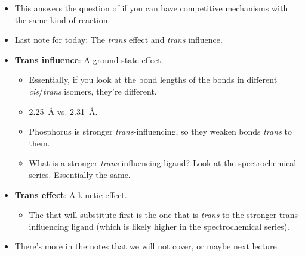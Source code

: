 \documentclass[../notes.tex]{subfiles}
\begin{document}
\begin{itemize}
    \item This answers the question of if you can have competitive mechanisms with the same kind of reaction.
    \item Last note for today: The \emph{trans} effect and \emph{trans} influence.
    \item \textbf{Trans influence}: A ground state effect.
    \begin{itemize}
        \item Essentially, if you look at the bond lengths of the  bonds in different \emph{cis}/\emph{trans} isomers, they're different.
        \item \SI{2.25}{\angstrom} vs. \SI{2.31}{\angstrom}.
        \item Phosphorus is stronger \emph{trans}-influencing, so they weaken bonds \emph{trans} to them.
        \item What is a stronger \emph{trans} influencing ligand? Look at the spectrochemical series. Essentially the same.
    \end{itemize}
    \item \textbf{Trans effect}: A kinetic effect.
    \begin{itemize}
        \item The  that will substitute first is the one that is \emph{trans} to the stronger trans-influencing ligand (which is likely higher in the spectrochemical series).
    \end{itemize}
    \item There's more in the notes that we will not cover, or maybe next lecture.
\end{itemize}
\end{document}
